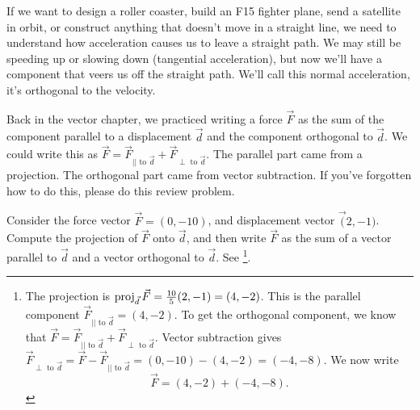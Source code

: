 If we want to design a roller coaster, build an F15 fighter plane, send a satellite in orbit, or construct anything that doesn't move in a straight line, we need to understand how acceleration causes us to leave a straight path. We may still be speeding up or slowing down (tangential acceleration), but now we'll have a component that veers us off the straight path.  We'll call this normal acceleration, it's orthogonal to the velocity. 

Back in the vector chapter, we practiced writing a force $\vec F$ as the sum of the component parallel to a displacement $\vec d$ and the component orthogonal to $\vec d$.  We could write this as $\vec F = \vec F_{|| \text{ to }\vec d} + \vec F_{\perp \text{ to }\vec d}.$ The parallel part came from a projection.  The orthogonal part came from vector subtraction.  If you've forgotten how to do this, please do this review problem.

\begin{review*}
 Consider the force vector $\vec F = (0,-10)$, and displacement vector $\vec (2,-1)$.  Compute the projection of $\vec F$ onto $\vec d$, and then write $\vec F$ as the sum of a vector parallel to $\vec d$ and a vector orthogonal to $\vec d$. See \footnote{
The projection is $\operatorname{proj}_{\vec d}\vec F = \frac{10}{5}(2,-1) = (4,-2)$.  This is the parallel component $\vec F_{|| \text{ to }\vec d} =(4,-2)$.  To get the orthogonal component, we know that $\vec F = \vec F_{|| \text{ to }\vec d} + \vec F_{\perp \text{ to }\vec d}$. Vector subtraction gives
$\vec F_{\perp \text{ to }\vec d} = \vec F -\vec F_{|| \text{ to }\vec d} = (0,-10)-(4,-2) = (-4,-8)$.
We now write 
$$\vec F = (4,-2) + (-4,-8).$$
}. 
\end{review*}



